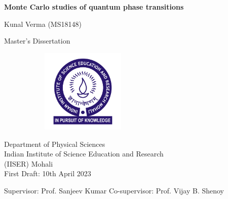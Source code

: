 \documentclass[a4paper,12pt]{report}
\numberwithin{equation}{section}
\begin{document}
\begin{titlepage}
  \begin{center}
      \textrm{\LARGE \textbf{Monte Carlo studies of quantum phase transitions}} \\
  \end{center}
  \vspace{0.5cm}
  \begin{center}\textsf{\Large 
  Kunal Verma (MS18148)} \\
  \end{center}
  \vspace{0.5cm}
  \begin{center}\textsf{\Large 
  Master's Dissertation} \\
  \end{center}
  \vspace{0.5cm}

  \begin{center}
  \begin{figure}[!htb]
      \centering
      \begin{subfigure}[b]{0.7\textwidth}  %
          \centering
          \includegraphics[width=4cm]{images/logo.png}
      \end{subfigure}
  \end{figure}
  \vspace{0.2cm}
  \textsf{\Large {Department of Physical Sciences}} \\
  \vspace{0.2cm}
  \textsf{\Large {Indian Institute of Science Education and Research}}\\
  \vspace{0.1cm}
  \textsf{\Large {(IISER) Mohali}}\\
  \vspace{1.5cm}
  \textsf{\Large{First Draft: 10th April 2023}}
  \end{center}

  \vspace{1cm}
  
  \begin{center}
  \textsf{\large {Supervisor: Prof. Sanjeev Kumar \hfill Co-supervisor: Prof. Vijay B. Shenoy}}
  \end{center}

  \end{titlepage}
\setcounter{page}{2}
\end{document}
